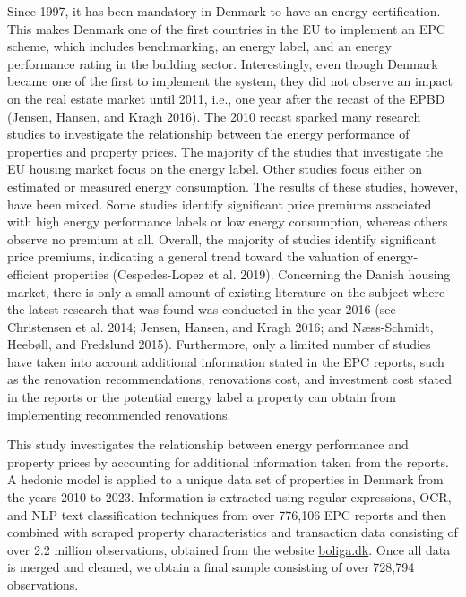 \documentclass[
  letterpaper,
  DIV=11,
  numbers=noendperiod]{scrreprt}
\begin{document}
Since 1997, it has been mandatory in Denmark to have an energy
certification. This makes Denmark one of the first countries in the EU
to implement an EPC scheme, which includes benchmarking, an energy
label, and an energy performance rating in the building sector.
Interestingly, even though Denmark became one of the first to implement
the system, they did not observe an impact on the real estate market
until 2011, i.e., one year after the recast of the EPBD (Jensen, Hansen,
and Kragh 2016). The 2010 recast sparked many research studies to
investigate the relationship between the energy performance of
properties and property prices. The majority of the studies that
investigate the EU housing market focus on the energy label. Other
studies focus either on estimated or measured energy consumption. The
results of these studies, however, have been mixed. Some studies
identify significant price premiums associated with high energy
performance labels or low energy consumption, whereas others observe no
premium at all. Overall, the majority of studies identify significant
price premiums, indicating a general trend toward the valuation of
energy-efficient properties (Cespedes-Lopez et al. 2019). Concerning the
Danish housing market, there is only a small amount of existing
literature on the subject where the latest research that was found was
conducted in the year 2016 (see Christensen et al. 2014; Jensen, Hansen,
and Kragh 2016; and Næss-Schmidt, Heebøll, and Fredslund 2015).
Furthermore, only a limited number of studies have taken into account
additional information stated in the EPC reports, such as the renovation
recommendations, renovations cost, and investment cost stated in the
reports or the potential energy label a property can obtain from
implementing recommended renovations.

This study investigates the relationship between energy performance and
property prices by accounting for additional information taken from the
reports. A hedonic model is applied to a unique data set of properties
in Denmark from the years 2010 to 2023. Information is extracted using
regular expressions, OCR, and NLP text classification techniques from
over 776,106 EPC reports and then combined with scraped property
characteristics and transaction data consisting of over 2.2 million
observations, obtained from the website
\href{https://www.boliga.dk/}{boliga.dk}. Once all data is merged and
cleaned, we obtain a final sample consisting of over 728,794
observations.
\end{document}
